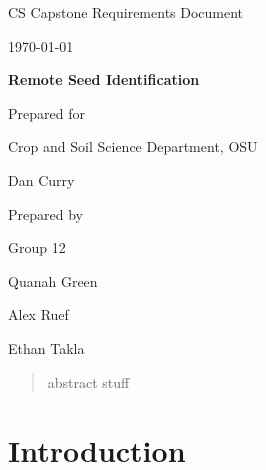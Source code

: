 \documentclass[onecolumn, draftclsnofoot,10pt, compsoc]{IEEEtran}
\def \CapstoneTeamName{		The Cleverly Named Team}
\def \CapstoneTeamNumber{		12}
\def \GroupMemberOne{			Quanah Green}
\def \GroupMemberTwo{			Alex Ruef}
\def \GroupMemberThree{			Ethan Takla}
\def \CapstoneProjectName{		Remote Seed Identification}
\def \CapstoneSponsorCompany{	Crop and Soil Science Department, OSU}
\def \CapstoneSponsorPerson{		Dan Curry}
\def \DocType{		%
				Requirements Document
				}
\newcommand{\NameSigPair}[1]{\par
\makebox[2.75in][r]{#1} \hfil 	\makebox[3.25in]{\makebox[2.25in]{\hrulefill} \hfill		\makebox[.75in]{\hrulefill}}
\par\vspace{-12pt} \textit{\tiny\noindent
\makebox[2.75in]{} \hfil		\makebox[3.25in]{\makebox[2.25in][r]{Signature} \hfill	\makebox[.75in][r]{Date}}}}
\renewcommand{\NameSigPair}[1]{#1}
\begin{document}
\begin{titlepage}
    \begin{singlespace}
        \hfill 
        \par\vspace{.2in}
        \centering
        \scshape{
            \huge CS Capstone \DocType \par
            {\large\today}\par
            \vspace{.5in}
            \textbf{\Huge\CapstoneProjectName}\par
            \vfill
            {\large Prepared for}\par
            \Huge \CapstoneSponsorCompany\par
            \vspace{5pt}
            {\Large\NameSigPair{\CapstoneSponsorPerson}\par}
            {\large Prepared by }\par
            Group\CapstoneTeamNumber\par
            \vspace{5pt}
            {\Large
                \NameSigPair{\GroupMemberOne}\par
                \NameSigPair{\GroupMemberTwo}\par
                \NameSigPair{\GroupMemberThree}\par
            }
            \vspace{20pt}
        }
        \begin{abstract}
		abstract stuff

        \end{abstract}     
    \end{singlespace}
\end{titlepage}
\newpage
{}
\tableofcontents
\clearpage

\section{Introduction}
\end{document}

